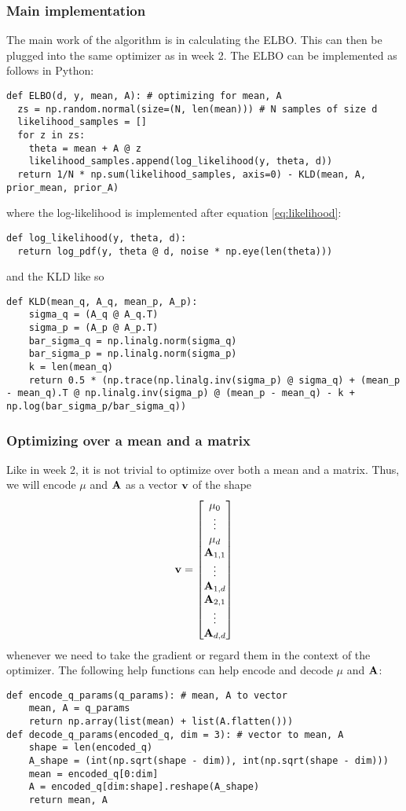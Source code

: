 \subsubsection{Main implementation}
The main work of the algorithm is in calculating the ELBO. This can then be plugged into the same optimizer as in week 2.
The ELBO can be implemented as follows in Python:
\begin{verbatim}
def ELBO(d, y, mean, A): # optimizing for mean, A
  zs = np.random.normal(size=(N, len(mean))) # N samples of size d
  likelihood_samples = []
  for z in zs:
    theta = mean + A @ z
    likelihood_samples.append(log_likelihood(y, theta, d))
  return 1/N * np.sum(likelihood_samples, axis=0) - KLD(mean, A, prior_mean, prior_A)
\end{verbatim}
where the log-likelihood is implemented after equation \ref{eq:likelihood}:
\begin{verbatim}
def log_likelihood(y, theta, d):
  return log_pdf(y, theta @ d, noise * np.eye(len(theta)))
\end{verbatim}
and the KLD like so
\begin{verbatim}
def KLD(mean_q, A_q, mean_p, A_p):
    sigma_q = (A_q @ A_q.T)
    sigma_p = (A_p @ A_p.T)
    bar_sigma_q = np.linalg.norm(sigma_q)
    bar_sigma_p = np.linalg.norm(sigma_p)
    k = len(mean_q)
    return 0.5 * (np.trace(np.linalg.inv(sigma_p) @ sigma_q) + (mean_p - mean_q).T @ np.linalg.inv(sigma_p) @ (mean_p - mean_q) - k + np.log(bar_sigma_p/bar_sigma_q))
\end{verbatim}
\subsubsection{Optimizing over a mean and a matrix}
Like in week 2, it is not trivial to optimize over both a mean and a matrix. Thus, we will encode $\mu$ and $\mathbf{A}$ as a vector $\mathbf{v}$ of the shape
$$\mathbf{v}=\begin{bmatrix}\mu_0 \\ \vdots \\ \mu_d \\ \mathbf{A}_{1,1} \\ \vdots \\ \mathbf{A}_{1,d} \\ \mathbf{A}_{2,1} \\ \vdots \\ \mathbf{A}_{d, d}\end{bmatrix}$$
whenever we need to take the gradient or regard them in the context of the optimizer.
The following help functions can help encode and decode $\mu$ and $\mathbf{A}$:
\begin{verbatim}
def encode_q_params(q_params): # mean, A to vector
    mean, A = q_params
    return np.array(list(mean) + list(A.flatten()))
def decode_q_params(encoded_q, dim = 3): # vector to mean, A
    shape = len(encoded_q)
    A_shape = (int(np.sqrt(shape - dim)), int(np.sqrt(shape - dim)))
    mean = encoded_q[0:dim]
    A = encoded_q[dim:shape].reshape(A_shape)
    return mean, A
\end{verbatim}
